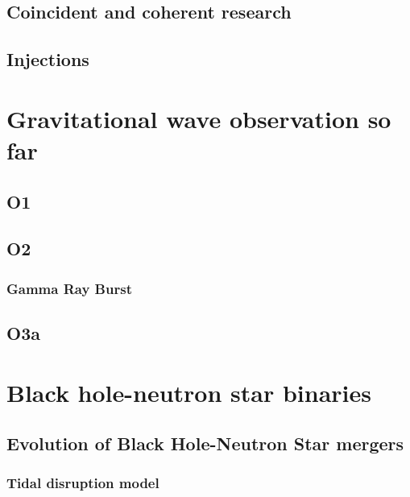 \documentclass[binding=0.6cm, LaM]{sapthesis}
\begin{document}
\section{Coincident and coherent research}

\section{Injections}

\chapter{Gravitational wave observation so far}

\section{O1}

\section{O2}

\subsection{Gamma Ray Burst}

\section{O3a}
\chapter{Black hole-neutron star binaries}



\section{Evolution of Black Hole-Neutron Star mergers}



\subsection{Tidal disruption model}
\end{document}
